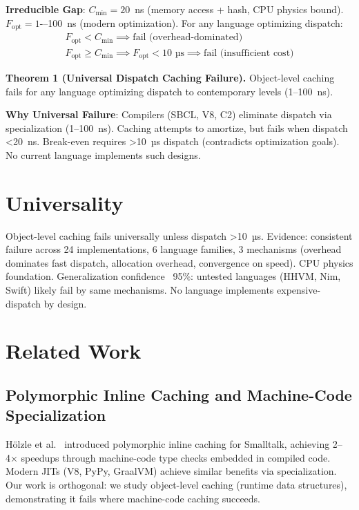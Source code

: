 \documentclass[sigplan,final,acmsmall,review,screen]{acmart}
\begin{document}
\textbf{Irreducible Gap}: $C_{\text{min}} = 20$~ns (memory access + hash, CPU physics bound). $F_{\text{opt}} = 1$-–100~ns (modern optimization). For any language optimizing dispatch:
\begin{align}
F_{\text{opt}} < C_{\text{min}} \implies \text{fail (overhead-dominated)} \\
F_{\text{opt}} \geq C_{\text{min}} \implies F_{\text{opt}} < 10\text{ µs} \implies \text{fail (insufficient cost)}
\end{align}

\begin{boxedtheorem}
\textbf{Theorem 1 (Universal Dispatch Caching Failure).} Object-level caching fails for any language optimizing dispatch to contemporary levels (1--100~ns).
\end{boxedtheorem}

\textbf{Why Universal Failure}: Compilers (SBCL, V8, C2) eliminate dispatch via specialization (1--100~ns). Caching attempts to amortize, but fails when dispatch <20~ns. Break-even requires >10~µs dispatch (contradicts optimization goals). No current language implements such designs.


\section{Universality}

Object-level caching fails universally unless dispatch >10~µs. Evidence: consistent failure across 24 implementations, 6 language families, 3 mechanisms (overhead dominates fast dispatch, allocation overhead, convergence on speed). CPU physics foundation. Generalization confidence ~95\%: untested languages (HHVM, Nim, Swift) likely fail by same mechanisms. No language implements expensive-dispatch by design.

\section{Related Work}

\subsection{Polymorphic Inline Caching and Machine-Code Specialization}

Hölzle et al.~\cite{hoelzle1991optimizing} introduced polymorphic inline caching for Smalltalk, achieving 2--4× speedups through machine-code type checks embedded in compiled code. Modern JITs (V8, PyPy, GraalVM) achieve similar benefits via specialization. Our work is orthogonal: we study object-level caching (runtime data structures), demonstrating it fails where machine-code caching succeeds.
\end{document}
